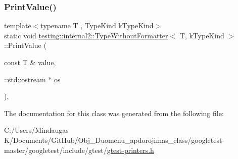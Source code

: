 \subsubsection{\texorpdfstring{PrintValue()}{PrintValue()}\hspace{0.1cm}{\footnotesize\ttfamily [3/3]}}
{\footnotesize\ttfamily template$<$typename T , Type\+Kind k\+Type\+Kind$>$ \\
static void \mbox{\hyperlink{classtesting_1_1internal2_1_1_type_without_formatter}{testing\+::internal2\+::\+Type\+Without\+Formatter}}$<$ T, k\+Type\+Kind $>$\+::Print\+Value (\begin{DoxyParamCaption}\item[{const T \&}]{value,  }\item[{\+::std\+::ostream $\ast$}]{os }\end{DoxyParamCaption})\hspace{0.3cm}{\ttfamily [inline]}, {\ttfamily [static]}}



The documentation for this class was generated from the following file\+:\begin{DoxyCompactItemize}
\item 
C\+:/\+Users/\+Mindaugas K/\+Documents/\+Git\+Hub/\+Obj\+\_\+\+Duomenu\+\_\+apdorojimas\+\_\+class/googletest-\/master/googletest/include/gtest/\mbox{\hyperlink{googletest-master_2googletest_2include_2gtest_2gtest-printers_8h}{gtest-\/printers.\+h}}\end{DoxyCompactItemize}
